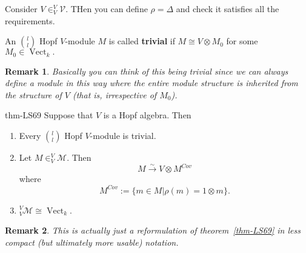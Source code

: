 \documentclass[12pt]{article}
\theoremstyle{break}
\theoremstyle{nonumberbreak}
\theoremstyle{changebreak}
\newtheorem{thm}{Theorem}[subsection]
\newenvironment{thm-prime}[1]
  {\renewcommand{\thethm}{\ref{#1}$'$}%
   \addtocounter{thm}{-1}%
   \begin{thm}}
  {\end{thm}}
\theoremstyle{break}
\theoremstyle{nonumberbreak}
\theoremstyle{nonumberplain}
\theoremstyle{change}
\newtheorem{rmk}[thm]{Remark}
\newcommand*{\Vectk}{\operatorname{Vect}_k}
\begin{document}
\begin{ex}
	Consider $V\in _V^V\mathcal{V}$. THen you can define $\rho=\Delta$ and check it satisfies all the requirements.
\end{ex}
\begin{defn}
	An $\binom{l}{l}$ Hopf $V$-module $M$ is called \textbf{trivial} if $M\cong V\otimes M_0$ for some $M_0\in\Vectk.$
\end{defn}
\begin{rmk}
	Basically you can think of this being trivial since we can \textit{always} define a module in this way
	where the entire module structure is inherited from the structure of $V$ (that is, irrespective of $M_0$).
\end{rmk}
\begin{thm-prime}{thm-LS69}%
	Suppose that $V$ is a Hopf algebra. Then
	\begin{enumerate}
		\item Every $\binom{l}{l}$ Hopf $V$-module is trivial.
		\item Let $M\in _V^V\mathcal{M}$. Then 
		\[M\xrightarrow{\sim} V\otimes M^{Cov}\]
		where
		\[M^{Cov}:=\{m\in M|\rho(m)=1\otimes m\}.\]
		\item $_V^V\mathcal{M}\cong \Vectk$.
	\end{enumerate}
\end{thm-prime}
\begin{rmk}
	This is actually just a reformulation of theorem~\ref{thm-LS69} in less compact (but ultimately more usable) notation.
\end{rmk}
\end{document}
